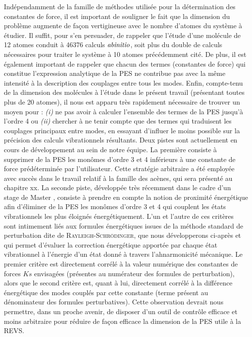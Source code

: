 \documentclass[12pt,a4paper]{book}
\begin{document}
Indépendamment de la famille de méthodes utilisée pour la détermination des constantes de force, il est important de souligner le fait que la dimension du problème augmente de façon vertigineuse avec le nombre d’atomes du système à étudier. Il suffit, pour s’en persuader, de rappeler que l’étude d’une molécule de 12 atomes conduit à 46376 calculs $\it{ab initio}$, soit plus du double de calculs nécessaires pour traiter le système à 10 atomes précédemment cité. De plus, il est également important de rappeler que chacun des termes (constantes de force) qui constitue l’expression analytique de la PES ne contribue pas avec la même intensité à la description des couplages entre tous les modes. Enfin, compte-tenu de la dimension des molécules à l'étude dans le présent travail (présentant toutes plus de 20 atomes), il nous est apparu très rapidement nécessaire de trouver un moyen pour : \textit{(i)} ne pas avoir à calculer l’ensemble des termes de la PES jusqu’à l’ordre 4 ou \textit{(ii)} chercher à ne tenir compte que des termes qui traduisent les couplages principaux entre modes, en essayant d’influer le moins possible sur la précision des calculs vibrationnels résultants. 
Deux pistes sont actuellement en cours de développement au sein de  notre équipe. La première consiste à supprimer de la PES les monômes d’ordre 3 et 4 inférieurs à une constante de force prédéterminée par l’utilisateur. Cette stratégie \og arbitraire \fg{} a été employée avec succès dans le travail relatif à la famille des acènes, qui sera présenté au chapitre xx. La seconde piste, développée très récemment dans le cadre d’un stage de Master \cite{fradet2016}, consiste à prendre en compte la notion de \og proximité énergétique \fg{} afin d’éliminer de la PES les monômes d’ordre 3 et 4 qui couplent les états vibrationnels les plus éloignés énergétiquement. L’un et l’autre de ces critères sont intimement liés aux formules énergétiques issues de la méthode standard de perturbation dite de \textsc{Rayleigh-Schrödinger}, que nous développerons ci-après et qui permet d’évaluer la correction énergétique apportée par chaque état vibrationnel à l’énergie d’un état donné à travers l’ahnarmonicité mécanique. Le premier critère est directement corrélé à la valeur numérique des constantes de forces $Ks$ envisagées (présentes au numérateur des formules de perturbation), alors que le second critère est, quant à lui, directement corrélé à la différence énergétique des modes couplés par cette constante (terme présent au dénominateur des formules perturbatives). Cette observation devrait nous permettre, dans un proche avenir, de disposer d’un outil de contrôle efficace et moins \og arbitraire \fg{} pour réduire de façon efficace la dimension de la PES utile à la REVS. 
\end{document}
